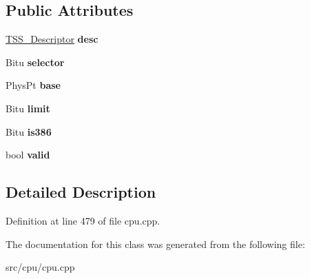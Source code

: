\subsection*{Public Attributes}
\begin{DoxyCompactItemize}
\item 
\hypertarget{classTaskStateSegment_a46267346746acbf867d029fd39f902e3}{\hyperlink{classTSS__Descriptor}{T\-S\-S\-\_\-\-Descriptor} {\bfseries desc}}\label{classTaskStateSegment_a46267346746acbf867d029fd39f902e3}

\item 
\hypertarget{classTaskStateSegment_a0875f365d4c5477c70ed057924991bd5}{Bitu {\bfseries selector}}\label{classTaskStateSegment_a0875f365d4c5477c70ed057924991bd5}

\item 
\hypertarget{classTaskStateSegment_a95148a6c625f7821ad346627e7fe7829}{Phys\-Pt {\bfseries base}}\label{classTaskStateSegment_a95148a6c625f7821ad346627e7fe7829}

\item 
\hypertarget{classTaskStateSegment_a4dce1fe9bc4bd459bd908140219759f6}{Bitu {\bfseries limit}}\label{classTaskStateSegment_a4dce1fe9bc4bd459bd908140219759f6}

\item 
\hypertarget{classTaskStateSegment_ab002072334f2f1b417358b87e03a01e7}{Bitu {\bfseries is386}}\label{classTaskStateSegment_ab002072334f2f1b417358b87e03a01e7}

\item 
\hypertarget{classTaskStateSegment_a952e7e2635dd1b3074779a0498d74775}{bool {\bfseries valid}}\label{classTaskStateSegment_a952e7e2635dd1b3074779a0498d74775}

\end{DoxyCompactItemize}


\subsection{Detailed Description}


Definition at line 479 of file cpu.\-cpp.



The documentation for this class was generated from the following file\-:\begin{DoxyCompactItemize}
\item 
src/cpu/cpu.\-cpp\end{DoxyCompactItemize}
